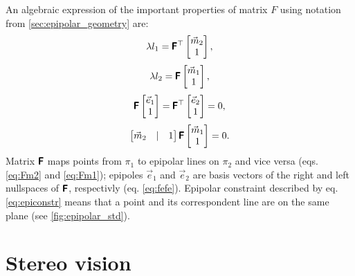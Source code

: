An algebraic expression of the important properties of matrix $F$ using notation from \autoref{sec:epipolar_geometry} are:
\begin{equation}
    \label{eq:Fm2}
    \lambda l_1 = \pmb{\mathsf{F}}^\top \begin{bmatrix} \vec{m}_2 \\ 1 \end{bmatrix},
\end{equation}
\begin{equation}
    \label{eq:Fm1}
    \lambda l_2 = \pmb{\mathsf{F}} \begin{bmatrix} \vec{m}_1 \\ 1 \end{bmatrix},
\end{equation}
\begin{equation}
    \label{eq:fefe}
    \pmb{\mathsf{F}} \begin{bmatrix} \vec{e}_1 \\ 1 \end{bmatrix} = \pmb{\mathsf{F}}^\top \begin{bmatrix} \vec{e}_2 \\ 1 \end{bmatrix} = 0,
\end{equation}
\begin{equation}
    \label{eq:epiconstr}
    \begin{bmatrix} \vec{m}_2 & | & 1 \end{bmatrix} \pmb{\mathsf{F}} \begin{bmatrix} \vec{m}_1 \\ 1 \end{bmatrix} = 0.
\end{equation}
Matrix $\pmb{\mathsf{F}}$ maps points from $\pi_1$ to epipolar lines on $\pi_2$ and vice versa (eqs. \eqref{eq:Fm2} and \eqref{eq:Fm1}); epipoles $\vec{e}_1$ and $\vec{e}_2$ are basis vectors of the right and left nullspaces of $\pmb{\mathsf{F}}$, respectivly (eq. \eqref{eq:fefe}).
Epipolar constraint described by eq. \eqref{eq:epiconstr} means that a point and its correspondent line are on the same plane (see \autoref{fig:epipolar_std}).

\section{Stereo vision}

